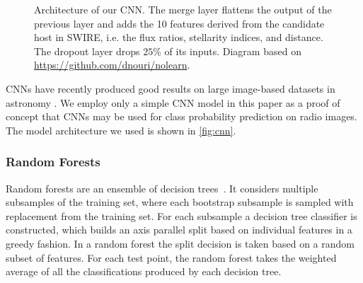 \documentclass[fleqn,usenatbib,usedcolumn]{mnras}
\newcommand{\todo}[1]{ {\color{red}[{\bf TODO:~{#1}}]} }
\begin{document}
\begin{figure}
        \caption{Architecture of our CNN. The merge layer flattens the output of
          the previous layer and adds the 10 features derived from the
          candidate host in SWIRE, i.e. the flux ratios, stellarity indices,
          and distance. The dropout layer drops $25\%$ of its
          inputs. Diagram based on \url{
          https://github.com/dnouri/nolearn}.}
        \label{fig:cnn}
      \end{figure}


      CNNs have recently produced good results on large image-based datasets in
      astronomy \citep[e.g.][]{dieleman15cnn, lukic17compact}. We employ only a
      simple CNN model in this paper as a proof of concept that CNNs may be used
      for class probability prediction on radio images. The model architecture
      we used is shown in \autoref{fig:cnn}.

    \subsubsection{Random Forests}
    \label{sec:random-forests}

      Random forests are an ensemble of decision
      trees~\citep{breiman01random-forest}. It considers multiple subsamples
      of the training set, where each bootstrap subsample is sampled with
      replacement from the training set. For each subsample a decision tree
      classifier is constructed, which builds an axis parallel split based on
      individual features in a greedy fashion. In a random forest the split
      decision is taken based on a random subset of features. For each test
      point, the random forest takes the weighted average of all the
      classifications produced by each decision tree.
\end{document}
